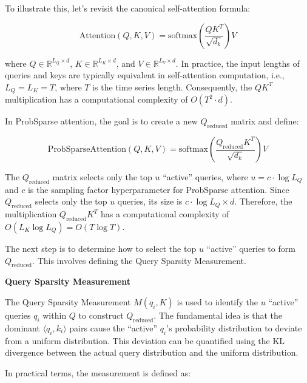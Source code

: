 To illustrate this, let’s revisit the canonical self-attention formula:

\begin{equation}
\text{Attention}(Q, K, V) = \text{softmax}\left(\frac{QK^T}{\sqrt{d_k}}\right)V
\end{equation}

where \( Q \in \mathbb{R}^{L_Q \times d} \), \( K \in \mathbb{R}^{L_K \times d} \), and \( V \in \mathbb{R}^{L_V \times d} \). In practice, the input lengths of queries and keys are typically equivalent in self-attention computation, i.e., \( L_Q = L_K = T \), where \( T \) is the time series length. Consequently, the \( QK^T \) multiplication has a computational complexity of \( O(T^2 \cdot d) \).

In ProbSparse attention, the goal is to create a new \( Q_{\text{reduced}} \) matrix and define:

\begin{equation}
\text{ProbSparseAttention}(Q, K, V) = \text{softmax}\left(\frac{Q_{\text{reduced}} K^T}{\sqrt{d_k}}\right)V
\end{equation}

The \( Q_{\text{reduced}} \) matrix selects only the top \( u \) ``active'' queries, where \( u = c \cdot \log L_Q \) and \( c \) is the sampling factor hyperparameter for ProbSparse attention. Since \( Q_{\text{reduced}} \) selects only the top \( u \) queries, its size is \( c \cdot \log L_Q \times d \). Therefore, the multiplication \( Q_{\text{reduced}} K^T \) has a computational complexity of \( O(L_K \log L_Q) = O(T \log T) \).

The next step is to determine how to select the top \( u \) ``active'' queries to form \( Q_{\text{reduced}} \). This involves defining the Query Sparsity Measurement.
\vspace{10pt}

\noindent\textbf{Query Sparsity Measurement}

\vspace{10pt}
\noindent The Query Sparsity Measurement \( M(q_i, K) \) is used to identify the \( u \) ``active'' queries \( q_i \) within \( Q \) to construct \( Q_{\text{reduced}} \). The fundamental idea is that the dominant \( \langle q_i, k_i \rangle \) pairs cause the ``active'' \( q_i \)'s probability distribution to deviate from a uniform distribution. This deviation can be quantified using the KL divergence between the actual query distribution and the uniform distribution.

In practical terms, the measurement is defined as:

